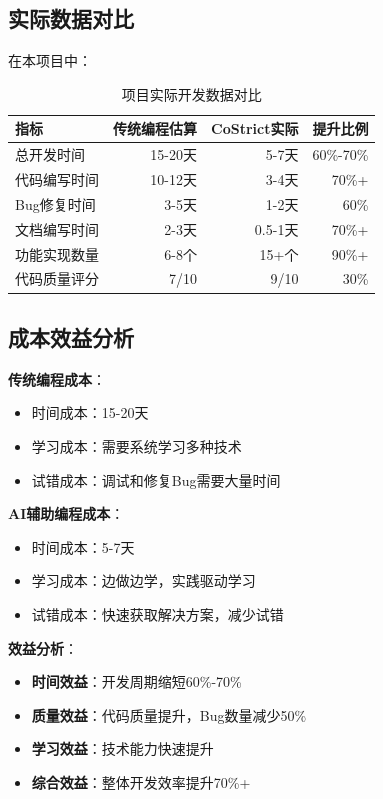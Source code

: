 \documentclass[12pt,a4paper]{article}
\begin{document}
\begin{itemize}
\subsection{实际数据对比}

在本项目中：

\begin{table}[ht]
\centering
\begin{tabular}{|l|r|r|r|}
\hline
\textbf{指标} & \textbf{传统编程估算} & \textbf{CoStrict实际} & \textbf{提升比例} \\
\hline
总开发时间 & 15-20天 & 5-7天 & 60\%-70\% \\
\hline
代码编写时间 & 10-12天 & 3-4天 & 70\%+ \\
\hline
Bug修复时间 & 3-5天 & 1-2天 & 60\% \\
\hline
文档编写时间 & 2-3天 & 0.5-1天 & 70\%+ \\
\hline
功能实现数量 & 6-8个 & 15+个 & 90\%+ \\
\hline
代码质量评分 & 7/10 & 9/10 & 30\% \\
\hline
\end{tabular}
\caption{项目实际开发数据对比}
\end{table}

\subsection{成本效益分析}

\textbf{传统编程成本}：
\begin{itemize}
    \item 时间成本：15-20天
    \item 学习成本：需要系统学习多种技术
    \item 试错成本：调试和修复Bug需要大量时间
\end{itemize}

\textbf{AI辅助编程成本}：
\begin{itemize}
    \item 时间成本：5-7天
    \item 学习成本：边做边学，实践驱动学习
    \item 试错成本：快速获取解决方案，减少试错
\end{itemize}

\textbf{效益分析}：
\begin{itemize}
    \item \textbf{时间效益}：开发周期缩短60\%-70\%
    \item \textbf{质量效益}：代码质量提升，Bug数量减少50\%
    \item \textbf{学习效益}：技术能力快速提升
    \item \textbf{综合效益}：整体开发效率提升70\%+
\end{itemize}


\end{itemize}
\end{document}
